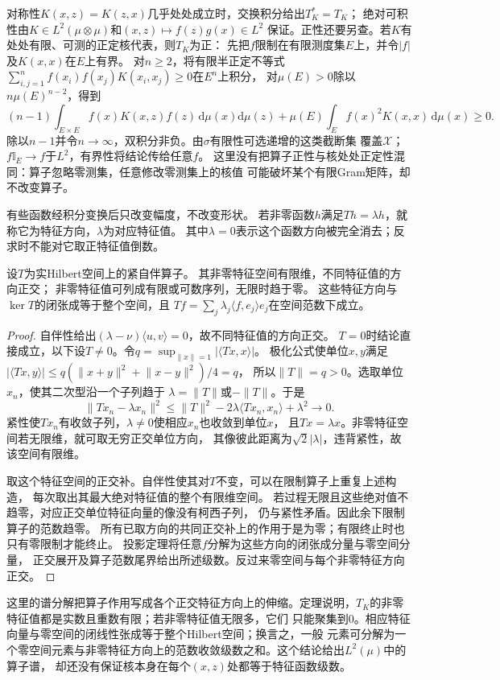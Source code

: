对称性$K(x,z)=K(z,x)$几乎处处成立时，交换积分给出$T_K^*=T_K$；
绝对可积性由$K\in L^2(\mu\otimes\mu)$和$(x,z)\mapsto f(z)g(x)\in L^2$
保证。正性还要另查。若$K$有处处有限、可测的正定核代表，则$T_K$为正：
先把$f$限制在有限测度集$E$上，并令$|f|$及$K(x,x)$在$E$上有界。
对$n\geq2$，将有限半正定不等式
$\sum_{i,j=1}^n f(x_i)f(x_j)K(x_i,x_j)\geq0$在$E^n$上积分，
对$\mu(E)>0$除以$n\mu(E)^{n-2}$，得到
\[
 (n-1)\int_{E\times E}f(x)K(x,z)f(z)\,\mathrm d\mu(x)\mathrm d\mu(z)
 +\mu(E)\int_E f(x)^2K(x,x)\,\mathrm d\mu(x)\geq0.
\]
除以$n-1$并令$n\to\infty$，双积分非负。由$\sigma$有限性可选递增的这类截断集
覆盖$\mathcal X$；$f\mathbb I_E\to f$于$L^2$，有界性将结论传给任意$f$。
这里没有把算子正性与核处处正定性混同：算子忽略零测集，任意修改零测集上的核值
可能破坏某个有限Gram矩阵，却不改变算子。

有些函数经积分变换后只改变幅度，不改变形状。
若非零函数$h$满足$Th=\lambda h$，就称它为特征方向，$\lambda$为对应特征值。
其中$\lambda=0$表示这个函数方向被完全消去；反求时不能对它取正特征值倒数。


\begin{theorem}[紧自伴算子的正交分解]
\label{thm:functional-compact-selfadjoint-spectrum}
设$T$为实Hilbert空间上的紧自伴算子。
其非零特征空间有限维，不同特征值的方向正交；
非零特征值可列成有限或可数序列，无限时趋于零。
这些特征方向与$\ker T$的闭张成等于整个空间，且
$Tf=\sum_j\lambda_j\langle f,e_j\rangle e_j$在空间范数下成立。
\end{theorem}
\begin{proof}
自伴性给出$(\lambda-\nu)\langle u,v\rangle=0$，故不同特征值的方向正交。
$T=0$时结论直接成立，以下设$T\neq0$。令$q=\sup_{\lVert x\rVert=1}|\langle Tx,x\rangle|$。
极化公式使单位$x,y$满足
$|\langle Tx,y\rangle|\leq q(\lVert x+y\rVert^2+\lVert x-y\rVert^2)/4=q$，
所以$\lVert T\rVert=q>0$。选取单位$x_n$，使其二次型沿一个子列趋于
$\lambda=\lVert T\rVert$或$-\lVert T\rVert$。于是
\[
 \lVert Tx_n-\lambda x_n\rVert^2
 \leq\lVert T\rVert^2-2\lambda\langle Tx_n,x_n\rangle+\lambda^2\to0.
\]
紧性使$Tx_n$有收敛子列，$\lambda\neq0$使相应$x_n$也收敛到单位$x$，
且$Tx=\lambda x$。非零特征空间若无限维，就可取无穷正交单位方向，
其像彼此距离为$\sqrt2|\lambda|$，违背紧性，故该空间有限维。

取这个特征空间的正交补。自伴性使其对$T$不变，可以在限制算子上重复上述构造，
每次取出其最大绝对特征值的整个有限维空间。
若过程无限且这些绝对值不趋零，对应正交单位特征向量的像没有柯西子列，
仍与紧性矛盾。因此余下限制算子的范数趋零。
所有已取方向的共同正交补上的作用于是为零；有限终止时也只有零限制才能终止。
投影定理将任意$f$分解为这些方向的闭张成分量与零空间分量，
正交展开及算子范数尾界给出所述级数。反过来零空间与每个非零特征方向正交。
\end{proof}
这里的谱分解把算子作用写成各个正交特征方向上的伸缩。定理说明，$T_K$的非零
特征值都是实数且重数有限；若非零特征值无限多，它们
只能聚集到$0$。相应特征向量与零空间的闭线性张成等于整个Hilbert空间；换言之，一般
元素可分解为一个零空间元素与非零特征方向上的范数收敛级数之和。这个结论给出$L^2(\mu)$中的算子谱，
却还没有保证核本身在每个$(x,z)$处都等于特征函数级数。

